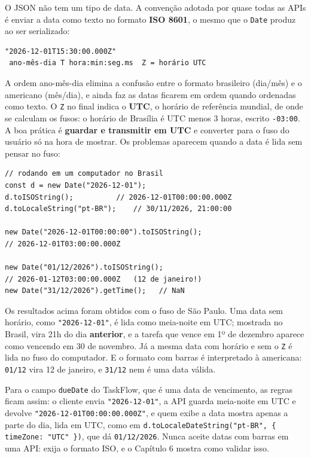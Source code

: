 O JSON não tem um tipo de data. A convenção adotada por quase todas as APIs é enviar a data como texto no formato \textbf{ISO 8601}, o mesmo que o \texttt{Date} produz ao ser serializado:

\begin{codigo}
\begin{Verbatim}[breaklines=true, breaksymbolleft={}, fontsize=\footnotesize]
"2026-12-01T15:30:00.000Z"
 ano-mês-dia T hora:min:seg.ms  Z = horário UTC
\end{Verbatim}
\end{codigo}

A ordem ano-mês-dia elimina a confusão entre o formato brasileiro (dia/mês) e o americano (mês/dia), e ainda faz as datas ficarem em ordem quando ordenadas como texto. O \texttt{Z} no final indica o \textbf{UTC}, o horário de referência mundial, de onde se calculam os fusos: o horário de Brasília é UTC menos 3 horas, escrito \texttt{-03:00}. A boa prática é \textbf{guardar e transmitir em UTC} e converter para o fuso do usuário só na hora de mostrar. Os problemas aparecem quando a data é lida sem pensar no fuso:

\begin{codigo}
\begin{Verbatim}[breaklines=true, breaksymbolleft={}, fontsize=\footnotesize]
// rodando em um computador no Brasil
const d = new Date("2026-12-01");
d.toISOString();          // 2026-12-01T00:00:00.000Z
d.toLocaleString("pt-BR");    // 30/11/2026, 21:00:00

new Date("2026-12-01T00:00:00").toISOString();
// 2026-12-01T03:00:00.000Z

new Date("01/12/2026").toISOString();
// 2026-01-12T03:00:00.000Z   (12 de janeiro!)
new Date("31/12/2026").getTime();   // NaN
\end{Verbatim}
\end{codigo}

Os resultados acima foram obtidos com o fuso de São Paulo. Uma data sem horário, como \texttt{"2026-12-01"}, é lida como meia-noite em UTC; mostrada no Brasil, vira 21h do dia \textbf{anterior}, e a tarefa que vence em 1º de dezembro aparece como vencendo em 30 de novembro. Já a mesma data com horário e sem o \texttt{Z} é lida no fuso do computador. E o formato com barras é interpretado à americana: \texttt{01/12} vira 12 de janeiro, e \texttt{31/12} nem é uma data válida.

Para o campo \texttt{dueDate} do TaskFlow, que é uma data de vencimento, as regras ficam assim: o cliente envia \texttt{"2026-12-01"}, a API guarda meia-noite em UTC e devolve \texttt{"2026-12-01T00:00:00.000Z"}, e quem exibe a data mostra apenas a parte do dia, lida em UTC, como em \texttt{d.toLocaleDateString("pt-BR", \{ timeZone: "UTC" \})}, que dá \texttt{01/12/2026}. Nunca aceite datas com barras em uma API: exija o formato ISO, e o Capítulo 6 mostra como validar isso.

